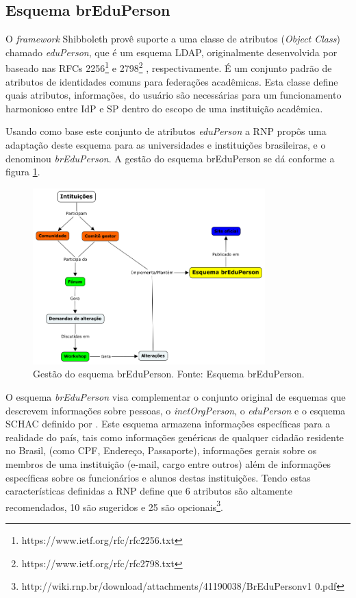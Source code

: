 \subsection{Esquema brEduPerson}
\label{ss_c2_breduperson}

O \textit{framework} Shibboleth provê suporte a uma classe de atributos (\textit{Object Class}) chamado \textit{eduPerson}, que é um esquema LDAP, originalmente desenvolvida por \cite{internet2:08} baseado nas RFCs 2256\footnote{https://www.ietf.org/rfc/rfc2256.txt} e 2798\footnote{https://www.ietf.org/rfc/rfc2798.txt} \cite{wahl:97, smith:00}, respectivamente. É um conjunto padrão de atributos de identidades comuns para federações acadêmicas. Esta classe define quais atributos, informações, do usuário são necessárias para um funcionamento harmonioso entre IdP e SP dentro do escopo de uma instituição acadêmica. 

Usando como base este conjunto de atributos \textit{eduPerson} a RNP propôs uma adaptação deste esquema para as universidades e instituições brasileiras, e o denominou \textit{brEduPerson}. A gestão do esquema brEduPerson se dá conforme a figura \ref{fig_3}.

\begin{figure}[!htpb]
 \centering
 \includegraphics[width=0.8\textwidth]{figuras/gestao-breduperson.png}
 \caption{Gestão do esquema brEduPerson. Fonte: Esquema brEduPerson.}
 \label{fig_3}
\end{figure}

O esquema \textit{brEduPerson} visa complementar o conjunto original de esquemas que descrevem informações sobre pessoas, o \textit{inetOrgPerson}, o \textit{eduPerson} e o esquema \ac{SCHAC} definido por \cite{terena:09}. Este esquema armazena informações específicas para a realidade do país, tais como informações genéricas de qualquer cidadão residente no Brasil, (como CPF, Endereço, Passaporte), informações gerais sobre os membros de uma instituição (e-mail, cargo entre outros) além de informações específicas sobre os funcionários e alunos destas instituições. Tendo estas características definidas a RNP define que 6 atributos são altamente recomendados, 10 são sugeridos e 25 são opcionais\footnote{http://wiki.rnp.br/download/attachments/41190038/BrEduPersonv1
0.pdf}.

